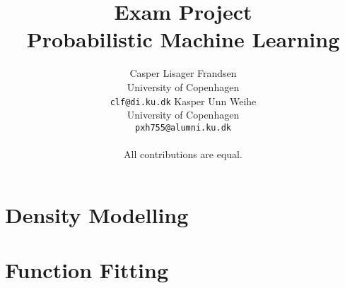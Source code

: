 \documentclass{article}
\title{
  Exam Project\\
  Probabilistic Machine Learning
}
\author{Casper Lisager Frandsen\\
  University of Copenhagen\\
  \texttt{clf@di.ku.dk}
  \AND           %
  Kasper Unn Weihe\\
  University of Copenhagen\\
  \texttt{pxh755@alumni.ku.dk}\\\\
  All contributions are equal.
}
\begin{document}
\maketitle


\renewcommand{\thesection}{A}

\section{Density Modelling}


\section{Function Fitting}





%
%
\end{document}
